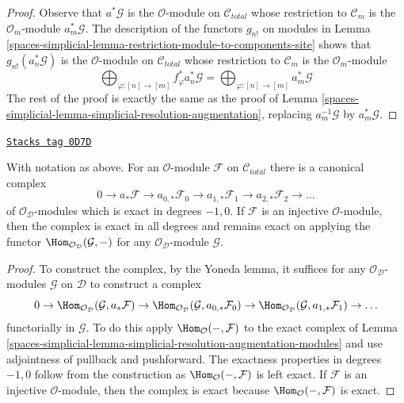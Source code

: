 \begin{proof}
Observe that $a^*\mathcal{G}$ is the $\mathcal{O}$-module on
$\mathcal{C}_{total}$ whose restriction to $\mathcal{C}_m$
is the $\mathcal{O}_m$-module $a_m^*\mathcal{G}$.
The description of the functors $g_{n!}$ on modules
in Lemma \ref{spaces-simplicial-lemma-restriction-module-to-components-site}
shows that $g_{n!}(a_n^*\mathcal{G})$ is the
$\mathcal{O}$-module on $\mathcal{C}_{total}$
whose restriction to $\mathcal{C}_m$ is the $\mathcal{O}_m$-module
$$
\bigoplus\nolimits_{\varphi : [n] \to [m]} f_\varphi^*a_n^*\mathcal{G} =
\bigoplus\nolimits_{\varphi : [n] \to [m]} a_m^*\mathcal{G}
$$
The rest of the proof is exactly the same as the proof of
Lemma \ref{spaces-simplicial-lemma-simplicial-resolution-augmentation},
replacing $a_m^{-1}\mathcal{G}$ by $a_m^*\mathcal{G}$.
\end{proof}

\begin{lemma}
\label{spaces-simplicial-lemma-augmentation-cech-complex-modules}
\href{https://stacks.math.columbia.edu/tag/0D7D}{\texttt{Stacks tag 0D7D}}

With notation as above.
For an $\mathcal{O}$-module $\mathcal{F}$ on $\mathcal{C}_{total}$
there is a canonical complex
$$
0 \to a_*\mathcal{F} \to a_{0, *}\mathcal{F}_0 \to a_{1, *}\mathcal{F}_1 \to
a_{2, *}\mathcal{F}_2 \to \ldots
$$
of $\mathcal{O}_\mathcal{D}$-modules which is exact in degrees $-1, 0$.
If $\mathcal{F}$ is an injective $\mathcal{O}$-module, then the complex
is exact in all degrees and remains exact on applying the functor
$\Hom_{\mathcal{O}_\mathcal{D}}(\mathcal{G}, -)$ for any
$\mathcal{O}_\mathcal{D}$-module $\mathcal{G}$.
\end{lemma}

\begin{proof}
To construct the complex, by the Yoneda lemma, it suffices for any
$\mathcal{O}_\mathcal{D}$-modules $\mathcal{G}$ on $\mathcal{D}$
to construct a complex
$$
0 \to \Hom_{\mathcal{O}_\mathcal{D}}(\mathcal{G}, a_*\mathcal{F}) \to
\Hom_{\mathcal{O}_\mathcal{D}}(\mathcal{G}, a_{0, *}\mathcal{F}_0) \to
\Hom_{\mathcal{O}_\mathcal{D}}(\mathcal{G}, a_{1, *}\mathcal{F}_1) \to \ldots
$$
functorially in $\mathcal{G}$. To do this apply
$\Hom_\mathcal{O}(-, \mathcal{F})$
to the exact complex of
Lemma \ref{spaces-simplicial-lemma-simplicial-resolution-augmentation-modules}
and use adjointness of pullback and pushforward.
The exactness properties in degrees $-1, 0$ follow from
the construction as $\Hom_\mathcal{O}(-, \mathcal{F})$ is left exact.
If $\mathcal{F}$ is an injective $\mathcal{O}$-module, then the
complex is exact because $\Hom_\mathcal{O}(-, \mathcal{F})$ is exact.
\end{proof}

